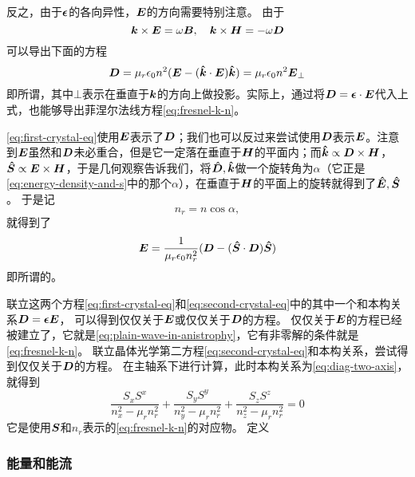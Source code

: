 反之，由于$\vb*{\epsilon}$的各向异性，$\vb*{E}$的方向需要特别注意。
由于
\[
    \vb*{k} \times \vb*{E} = \omega \vb*{B}, \quad \vb*{k} \times \vb*{H} = - \omega \vb*{D}
\]
可以导出下面的方程
\begin{equation}
    \vb*{D} = \mu_r \epsilon_0 n^2 (\vb*{E} - (\vu*{k} \cdot \vb*{E}) \vu*{k}) = \mu_r \epsilon_0 n^2 \vb*{E}_{\bot}
    \label{eq:first-crystal-eq}
\end{equation}
即所谓，其中$\bot$表示在垂直于$\vb*{k}$的方向上做投影。实际上，通过将$\vb*{D} = \vb*{\epsilon} \cdot \vb*{E}$代入上式，也能够导出菲涅尔法线方程\eqref{eq:fresnel-k-n}。

\eqref{eq:first-crystal-eq}使用$\vb*{E}$表示了$\vb*{D}$；我们也可以反过来尝试使用$\vb*{D}$表示$\vb*{E}$。注意到$\vb*{E}$虽然和$\vb*{D}$未必重合，但是它一定落在垂直于$\vb*{H}$的平面内；而$\vu*{k} \propto \vb*{D} \times \vb*{H}$，$\vu*{S} \propto \vb*{E} \times \vb*{H}$，于是几何观察告诉我们，将$\vu*{D},\vu*{k}$做一个旋转角为$\alpha$（它正是\eqref{eq:energy-density-and-s}中的那个$\alpha$），在垂直于$\vb*{H}$的平面上的旋转就得到了$\vu*{E}, \vu*{S}$。
于是记
\begin{equation}
    n_r = n \cos \alpha,
\end{equation}
就得到了
\begin{equation}
    \vb*{E} = \frac{1}{\mu_r \epsilon_0 n_r^2} (\vb*{D} - (\vu*{S} \cdot \vb*{D}) \vu*{S})
    \label{eq:second-crystal-eq}
\end{equation}
即所谓的。

联立这两个方程\eqref{eq:first-crystal-eq}和\eqref{eq:second-crystal-eq}中的其中一个和本构关系$\vb*{D} = \vb*{\epsilon} \vb*{E}$，
可以得到仅仅关于$\vb*{E}$或仅仅关于$\vb*{D}$的方程。
仅仅关于$\vb*{E}$的方程已经被建立了，它就是\eqref{eq:plain-wave-in-anistrophy}，它有非零解的条件就是\eqref{eq:fresnel-k-n}。
联立晶体光学第二方程\eqref{eq:second-crystal-eq}和本构关系，尝试得到仅仅关于$\vb*{D}$的方程。
在主轴系下进行计算，此时本构关系为\eqref{eq:diag-two-axis}，
就得到
\begin{equation}
    \frac{S_x S^x}{n_x^2 - \mu_r n_r^2} + \frac{S_y S^y}{n_y^2 - \mu_r n_r^2} + \frac{S_z S^z}{n_z^2 - \mu_r n_r^2} = 0
\end{equation}
它是使用$\vb*{S}$和$n_r$表示的\eqref{eq:fresnel-k-n}的对应物。
定义

\subsubsection{能量和能流}

